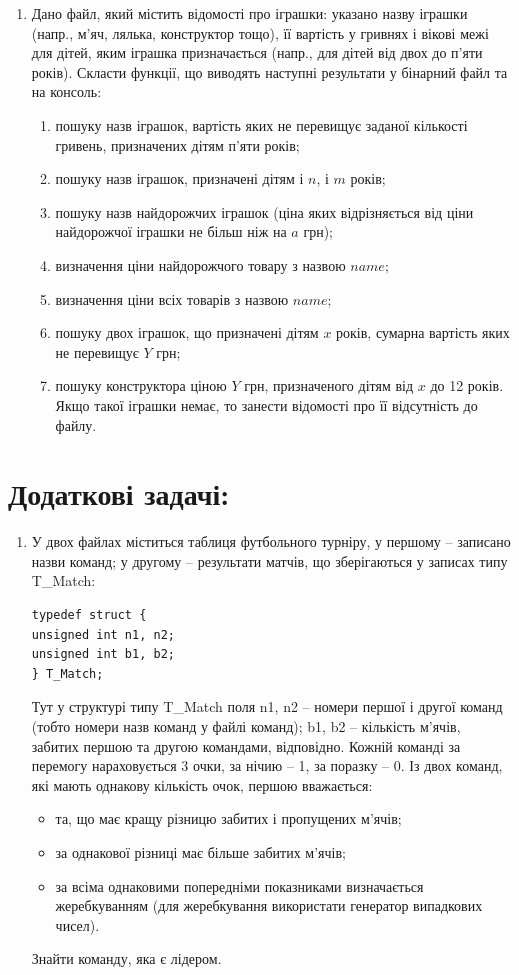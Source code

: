 \documentclass[a5paper,titlepage,openany,twoside,
]
{book_unv}%
\makeatletter
\newcommand{\xslalph}[1]{\expandafter\@xslalph\csname c@#1\endcsname}
\newcommand{\@xslalph}[1]{%
    \ifcase#1\or а\or б\or в\or г\or д\or e\or є\or ж\or з\or i%
    \or й\or к\or л\or м\or н\or о\or п\or р\or с\or т%
    \or у\or ф\or х\or ц\or ч\or ш\or ю\or я\or аа\or бб\or вв%
    \else\@ctrerr\fi%
}
\makeatother
\begin{document}
\begin{enumerate}
\begin{enumerate}
\item
  Дано файл, який містить відомості про іграшки: указано назву іграшки
  (напр., м'яч, лялька, конструктор тощо), її вартість у гривнях і
  вікові межі для дітей, яким іграшка призначається (напр., для дітей
  від двох до п'яти років). Скласти функції, що виводять наступні результати 
  у бінарний файл та на консоль:

  \begin{enumerate}[label=\xslalph*)]
\item
пошуку назв іграшок, вартість яких не перевищує заданої кількості гривень,
 призначених дітям п'яти років;
\item
пошуку назв іграшок, призначені дітям і $n$, і $m$ років;
\item
пошуку назв найдорожчих іграшок (ціна яких відрізняється від ціни
найдорожчої іграшки не більш ніж на $a$ грн);
\item визначення ціни найдорожчого товару з назвою $name$;
\item визначення ціни всіх товарів з назвою $name$;
\item пошуку двох іграшок, що призначені дітям $x$ років, сумарна
вартість яких не перевищує $Y$ грн;
\item
пошуку конструктора ціною $Y$ грн, призначеного дітям від $x$ до
12 років. Якщо такої іграшки немає, то занести відомості про її
відсутність до файлу.
  \end{enumerate} 


\end{enumerate}

\section{Додаткові задачі:}

\begin{enumerate}
\def\labelenumi{\arabic{enumi})}
\setcounter{enumi}{12}
\item
  У двох файлах міститься таблиця футбольного турніру, у першому --
  записано назви команд; у другому -- результати матчів, що зберігаються
  у записах типу T\_Match:
\begin{verbatim}
typedef struct {
unsigned int n1, n2;
unsigned int b1, b2;
} T_Match;
\end{verbatim}
Тут у структурі типу T\_Match поля n1, n2 -- номери першої і другої 
команд (тобто номери назв команд у файлі команд); b1, b2 -- кількість
м'ячів, забитих першою та другою командами, відповідно.
Кожній команді за перемогу нараховується 3 очки, за нічию -- 1, за
поразку -- 0.
Із двох команд, які мають однакову кількість очок, першою вважається:
\begin{itemize}
\item
та, що має кращу різницю забитих і пропущених м'ячів;
\item
за однакової різниці має більше забитих м'ячів;
\item
за всіма однаковими попередніми показниками визначається жеребкуванням
(для жеребкування використати генератор випадкових чисел).
\end{itemize}
Знайти команду, яка є лідером.


\end{enumerate}
\end{enumerate}
\end{document}
